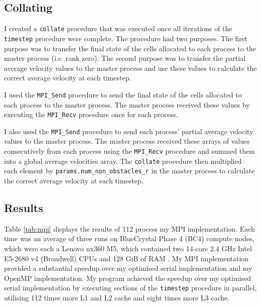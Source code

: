\documentclass[twocolumn, a4paper]{article}
\begin{document}
\subsection{Collating}

I created a \texttt{collate} procedure that was executed once all iterations of the \texttt{timestep} procedure were complete.
The procedure had two purposes.
The first purpose was to transfer the final state of the cells allocated to each process to the master process (i.e. rank zero).
The second purpose was to transfer the partial average velocity values to the master process and use these values to calculate the correct average velocity at each timestep.

I used the \texttt{MPI\_Send} procedure to send the final state of the cells allocated to each process to the master process.
The master process received these values by executing the \texttt{MPI\_Recv} procedure once for each process.

I also used the \texttt{MPI\_Send} procedure to send each process' partial average velocity values to the master process.
The master process received these arrays of values consecutively from each process using the \texttt{MPI\_Recv} procedure and summed them into a global average velocities array.
The \texttt{collate} procedure then multiplied each element by \texttt{params.num\_non\_obstacles\_r} in the master process to calculate the correct average velocity at each timestep.

\subsection{Results}

Table \ref{tab:mpi} displays the results of 112 process my MPI implementation.
Each time was an average of three runs on BlueCrystal Phase 4 (BC4) compute nodes, which were each a Lenovo nx360 M5, which contained two 14-core 2.4 GHz Intel E5-2680 v4 (Broadwell) CPUs and 128 GiB of RAM \cite{bcp4}.
My MPI implementation provided a substantial speedup over my optimised serial implementation and my OpenMP implementation.
My program achieved the speedup over my optimised serial implementation by executing sections of the \texttt{timestep} procedure in parallel, utilising 112 times more L1 and L2 cache and eight times more L3 cache.
\end{document}
